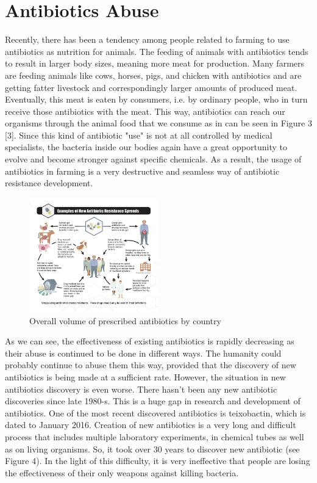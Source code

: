 \section{Antibiotics Abuse}

Recently, there has been a tendency among people related to farming to use antibiotics as nutrition for animals. The feeding of animals with antibiotics tends to result in larger body sizes, meaning more meat for production. Many farmers are feeding animals like cows, horses, pigs, and chicken with antibiotics and are getting fatter livestock and correspondingly larger amounts of produced meat. Eventually, this meat is eaten by consumers, i.e. by ordinary people, who in turn receive those antibiotics with the meat. This way, antibiotics can reach our organisms through the animal food that we consume as in can be seen in Figure 3 [3]. Since this kind of antibiotic "use" is not at all controlled by medical specialists, the bacteria inside our bodies again have a great opportunity to evolve and become stronger against specific chemicals. As a result, the usage of antibiotics in farming is a very destructive and seamless way of antibiotic resistance development.

\begin{figure}[H]
  \centering
  \includegraphics[width=0.5\textwidth]{img/Fig4}
  \caption{Overall volume of prescribed antibiotics by country}
  \label{fig4}
\end{figure}

As we can see, the effectiveness of existing antibiotics is rapidly decreasing as their abuse is continued to be done in different ways. The humanity could probably continue to abuse them this way, provided that the discovery of new antibiotics is being made at a sufficient rate. However, the situation in new antibiotics discovery is even worse. There hasn't been any new antibiotic discoveries since late 1980-s. This is a huge gap in research and development of antibiotics. One of the most recent discovered antibiotics is teixobactin, which is dated to January 2016. Creation of new antibiotics is a very long and difficult process that includes multiple laboratory experiments, in chemical tubes as well as on living organisms. So, it took over 30 years to discover new antibiotic (see Figure 4). In the light of this difficulty, it is very ineffective that people are losing the effectiveness of their only weapons against killing bacteria.

